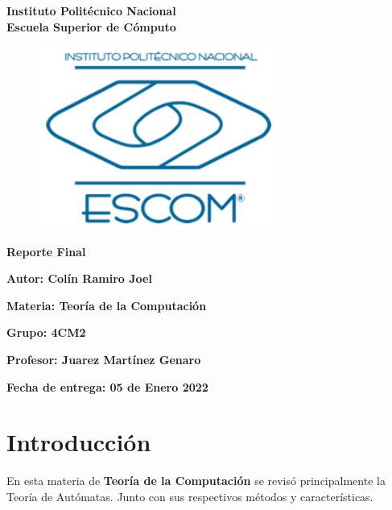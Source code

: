 \documentclass{article}
\begin{document}
	\begin{titlepage}
		\begin{center}
			{\huge\textbf{Instituto Politécnico Nacional}}\\
			\vspace{7mm}
			{\huge\textbf{Escuela Superior de Cómputo}}\\			
			\begin{figure}[h]
				\centering
				\includegraphics[height = 6cm]{logoEscom.png}
			\end{figure}	
			\vspace{1cm}
			{\huge\textbf{Reporte Final}}
			\par\vspace{2cm}
			\large\textbf{Autor: Colín Ramiro Joel}
			\par\vspace{1cm}
			{\large\textbf{Materia: Teoría de la Computación}}
			\par\vspace{1cm}
			{\large\textbf{Grupo: 4CM2}}
			\par\vspace{1cm}
			{\large\textbf{Profesor: Juarez Martínez Genaro}}
			\par\vspace{1cm}
			{\large\textbf{Fecha de entrega: {\huge{05 de Enero 2022}}}}
			\par\vspace{3cm}
		\end{center}
	\end{titlepage}
	\section*{Introducción}
	En esta materia de \textbf{Teoría de la Computación} se revisó principalmente la Teoría de Autómatas. Junto con sus respectivos métodos y características.
	 
	
\end{document}
